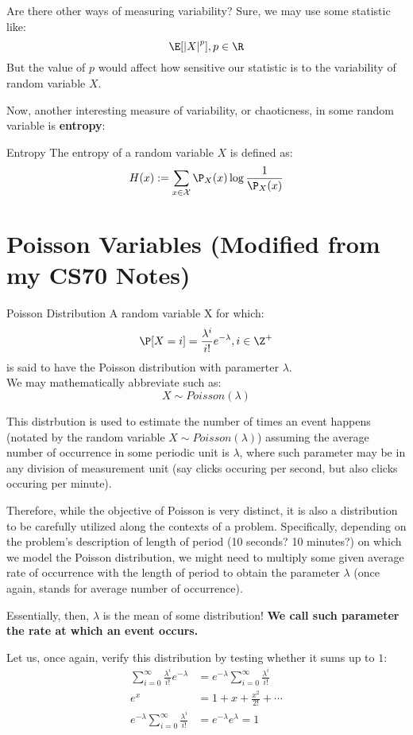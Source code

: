 Are there other ways of measuring variability? Sure, we may use some statistic like:
\[
    \E[{|X|}^p], p \in \R
\]
But the value of $p$ would affect how sensitive our statistic is to the variability of random variable $X$.

Now, another interesting measure of variability, or chaoticness, in some random variable is \textbf{entropy}:
\begin{ln-define}{Entropy}{}
    The entropy of a random variable $X$ is defined as:
    \[
        H(x) := \sum_{x \in \mathcal{X}} \P_X(x) \log{\frac{1}{\P_X(x)}}
    \]
\end{ln-define}

\section{Poisson Variables (Modified from my CS70 Notes)}
\begin{ln-define}{Poisson Distribution}{}
    A random variable X for which:
    \[\P[X = i] = \frac{\lambda^i}{i!} e^{-\lambda}, i \in \Z^+\]
    is said to have the Poisson distribution with paramerter $\lambda$. \\
    We may mathematically abbreviate such as:
    \[X \sim Poisson(\lambda)\]
\end{ln-define}
This distrbution is used to estimate the number of times an event happens (notated by the random variable $X \sim Poisson(\lambda)$) assuming the average number of occurrence in some periodic unit is $\lambda$, where such parameter may be in any division of measurement unit (say clicks occuring per second, but also clicks occuring per minute).

Therefore, while the objective of Poisson is very distinct, it is also a distribution to be carefully utilized along the contexts of a problem. Specifically, depending on the problem's description of length of period (10 seconds? 10 minutes?) on which we model the Poisson distribution, we might need to multiply some given average rate of occurrence with the length of period to obtain the parameter $\lambda$ (once again, stands for average number of occurrence).

Essentially, then, $\lambda$ is the mean of some distribution! \textbf{We call such parameter the rate at which an event occurs.}

Let us, once again, verify this distribution by testing whether it sums up to $1$:
\begin{align*}
    \sum_{i = 0}^\infty \frac{\lambda^i}{i!} e^{-\lambda}
    &= e^{-\lambda} \sum_{i = 0}^\infty \frac{\lambda^i}{i!} \\
    e^{x} &= 1 + x + \frac{x^2}{2!} + \cdots \\
    e^{-\lambda} \sum_{i = 0}^\infty \frac{\lambda^i}{i!}
    &= e^{-\lambda} e^{\lambda} = 1
\end{align*}

